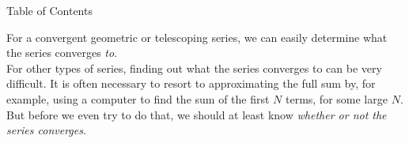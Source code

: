 

 \begin{frame}{Table of Contents }
\mapofcontentsC{\cc}
 \end{frame}
\begin{frame}
For a convergent geometric or telescoping series, we can easily determine what the series converges \textit{to}.\\[1em]

For other types of series, finding out what the series converges to can be very difficult. It is often necessary to resort to approximating the full sum by, for example, using a computer to find the sum of the first $N$ terms, for some large $N$. But before we even try to do that, we should at least know \textit{whether or not the series converges}.
\end{frame}
